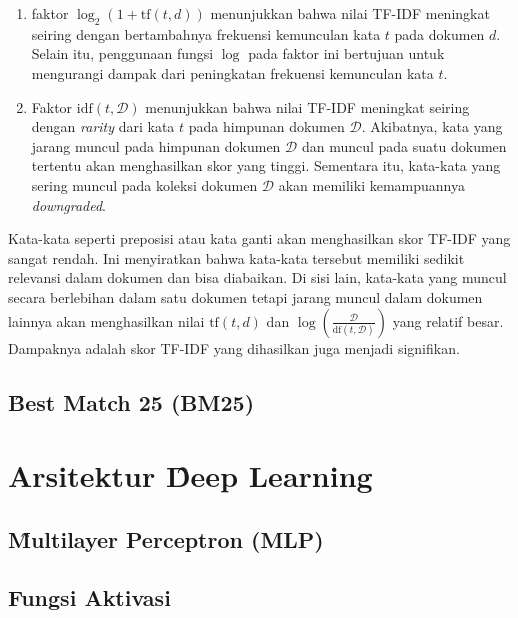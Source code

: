     \begin{enumerate}
        \item faktor $\log_2(1 + \text{tf}(t, d))$ menunjukkan bahwa nilai TF-IDF meningkat seiring dengan bertambahnya frekuensi kemunculan kata $t$ pada dokumen $d$. Selain itu, penggunaan fungsi $\log$ pada faktor ini bertujuan untuk mengurangi dampak dari peningkatan frekuensi kemunculan kata $t$. 
        \item Faktor $\text{idf}(t, \mathcal{D})$ menunjukkan bahwa nilai TF-IDF meningkat seiring dengan \textit{rarity} dari kata $t$ pada himpunan dokumen $\mathcal{D}$. Akibatnya, kata yang jarang muncul pada himpunan dokumen $\mathcal{D}$ dan muncul pada suatu dokumen tertentu akan menghasilkan skor yang tinggi. Sementara itu, kata-kata yang sering muncul pada koleksi dokumen $\mathcal{D}$ akan memiliki kemampuannya \textit{downgraded}.
    \end{enumerate}

    Kata-kata seperti preposisi atau kata ganti akan menghasilkan skor TF-IDF yang sangat rendah. Ini menyiratkan bahwa kata-kata tersebut memiliki sedikit relevansi dalam dokumen dan bisa diabaikan. Di sisi lain, kata-kata yang muncul secara berlebihan dalam satu dokumen tetapi jarang muncul dalam dokumen lainnya akan menghasilkan nilai $\text{tf}(t, d)$ dan $\log \left(\frac{\mathcal{D}}{\text{df}(t, \mathcal{D})}\right)$ yang relatif besar. Dampaknya adalah skor TF-IDF yang dihasilkan juga menjadi signifikan.

    \subsection{\f{Best Match 25} (BM25)}



    \label{sec:bm25}


\section{Arsitektur \f{Deep Learning}}

    \subsection{\f{Multilayer Perceptron} (MLP)}

    \subsection{Fungsi Aktivasi}

